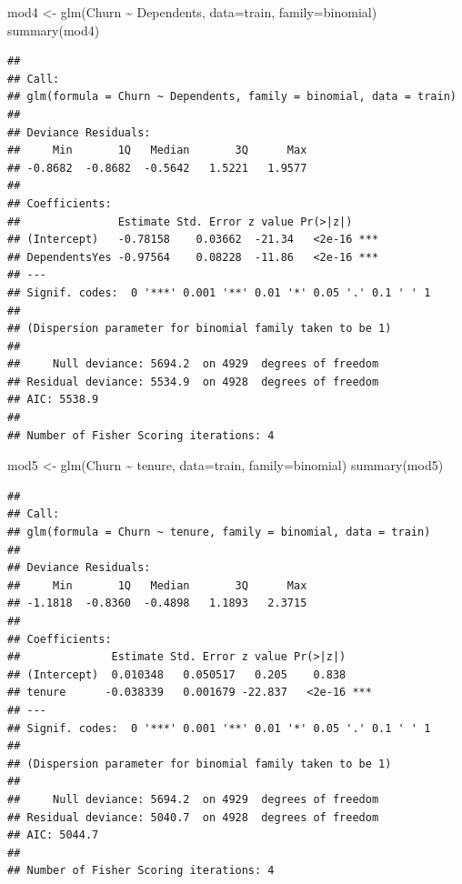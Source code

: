 \documentclass[
  twoside]{article}
\newenvironment{Shaded}{\begin{snugshade}}{\end{snugshade}}
\newcommand{\AttributeTok}[1]{\textcolor[rgb]{0.77,0.63,0.00}{#1}}
\newcommand{\FunctionTok}[1]{\textcolor[rgb]{0.00,0.00,0.00}{#1}}
\newcommand{\NormalTok}[1]{#1}
\newcommand{\OtherTok}[1]{\textcolor[rgb]{0.56,0.35,0.01}{#1}}
\newcommand{\SpecialCharTok}[1]{\textcolor[rgb]{0.00,0.00,0.00}{#1}}
\begin{document}
\begin{Shaded}
\begin{Highlighting}[]
\NormalTok{mod4 }\OtherTok{\textless{}{-}} \FunctionTok{glm}\NormalTok{(Churn }\SpecialCharTok{\textasciitilde{}}\NormalTok{ Dependents, }\AttributeTok{data=}\NormalTok{train, }\AttributeTok{family=}\NormalTok{binomial)}
\FunctionTok{summary}\NormalTok{(mod4)}
\end{Highlighting}
\end{Shaded}

\begin{verbatim}
## 
## Call:
## glm(formula = Churn ~ Dependents, family = binomial, data = train)
## 
## Deviance Residuals: 
##     Min       1Q   Median       3Q      Max  
## -0.8682  -0.8682  -0.5642   1.5221   1.9577  
## 
## Coefficients:
##               Estimate Std. Error z value Pr(>|z|)    
## (Intercept)   -0.78158    0.03662  -21.34   <2e-16 ***
## DependentsYes -0.97564    0.08228  -11.86   <2e-16 ***
## ---
## Signif. codes:  0 '***' 0.001 '**' 0.01 '*' 0.05 '.' 0.1 ' ' 1
## 
## (Dispersion parameter for binomial family taken to be 1)
## 
##     Null deviance: 5694.2  on 4929  degrees of freedom
## Residual deviance: 5534.9  on 4928  degrees of freedom
## AIC: 5538.9
## 
## Number of Fisher Scoring iterations: 4
\end{verbatim}

\begin{Shaded}
\begin{Highlighting}[]
\NormalTok{mod5 }\OtherTok{\textless{}{-}} \FunctionTok{glm}\NormalTok{(Churn }\SpecialCharTok{\textasciitilde{}}\NormalTok{ tenure, }\AttributeTok{data=}\NormalTok{train, }\AttributeTok{family=}\NormalTok{binomial)}
\FunctionTok{summary}\NormalTok{(mod5)}
\end{Highlighting}
\end{Shaded}

\begin{verbatim}
## 
## Call:
## glm(formula = Churn ~ tenure, family = binomial, data = train)
## 
## Deviance Residuals: 
##     Min       1Q   Median       3Q      Max  
## -1.1818  -0.8360  -0.4898   1.1893   2.3715  
## 
## Coefficients:
##              Estimate Std. Error z value Pr(>|z|)    
## (Intercept)  0.010348   0.050517   0.205    0.838    
## tenure      -0.038339   0.001679 -22.837   <2e-16 ***
## ---
## Signif. codes:  0 '***' 0.001 '**' 0.01 '*' 0.05 '.' 0.1 ' ' 1
## 
## (Dispersion parameter for binomial family taken to be 1)
## 
##     Null deviance: 5694.2  on 4929  degrees of freedom
## Residual deviance: 5040.7  on 4928  degrees of freedom
## AIC: 5044.7
## 
## Number of Fisher Scoring iterations: 4
\end{verbatim}
\end{document}
